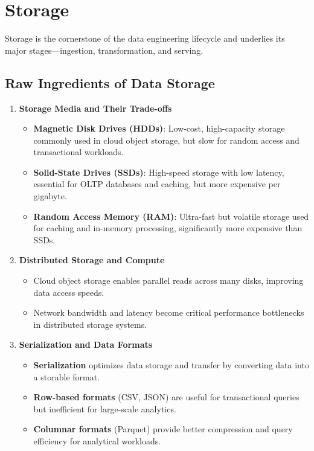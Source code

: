\section{Storage}
Storage is the cornerstone of the data engineering lifecycle and underlies
its major stages—ingestion, transformation, and serving.



\subsection{Raw Ingredients of Data Storage}

\begin{enumerate}
    \item \textbf{Storage Media and Their Trade-offs}
    \begin{itemize}
        \item \textbf{Magnetic Disk Drives (HDDs)}: Low-cost, high-capacity storage commonly used in cloud object storage, but slow for random access and transactional workloads.
        \item \textbf{Solid-State Drives (SSDs)}: High-speed storage with low latency, essential for OLTP databases and caching, but more expensive per gigabyte.
        \item \textbf{Random Access Memory (RAM)}: Ultra-fast but volatile storage used for caching and in-memory processing, significantly more expensive than SSDs.
    \end{itemize}
    
    \item \textbf{Distributed Storage and Compute}
    \begin{itemize}
        \item Cloud object storage enables parallel reads across many disks, improving data access speeds.
        \item Network bandwidth and latency become critical performance bottlenecks in distributed storage systems.
    \end{itemize}
    
    \item \textbf{Serialization and Data Formats}
    \begin{itemize}
        \item \textbf{Serialization} optimizes data storage and transfer by converting data into a storable format.
        \item \textbf{Row-based formats} (CSV, JSON) are useful for transactional queries but inefficient for large-scale analytics.
        \item \textbf{Columnar formats} (Parquet) provide better compression and query efficiency for analytical workloads.
    \end{itemize}
    

\end{enumerate}
